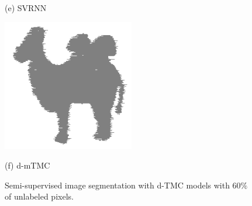 \documentclass{article}
\begin{document}
\begin{figure}[htb]
\begin{minipage}[b]{.30\linewidth}
        \centerline{(e) SVRNN}\medskip
      \end{minipage}
      \hfill
      \begin{minipage}[b]{0.30\linewidth}
        \centering
        \centerline{\includegraphics[width=\textwidth,cfbox=black 1pt 0pt]{ress/camel60/camel60_tmm_3.png}}
        \centerline{(f) d-mTMC}\medskip
      \end{minipage}
    \caption{Semi-supervised image segmentation with d-TMC models with $60\%$ of unlabeled pixels.}
    \label{fig:res_camel60}
\end{figure}




 
 
\end{document}
